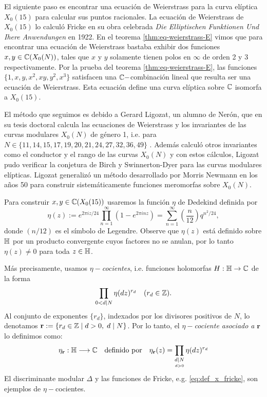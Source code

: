 \documentclass[../../tesis_maestria]{subfiles}
\begin{document}
El siguiente paso es encontrar una ecuación de Weierstrass para la curva elíptica $X_0(15)$ para calcular sus puntos racionales. La ecuación de Weierstrass de $X_0(15)$ lo calculó Fricke en su obra celebrada \emph{Die Elliptischen Funktionen Und Ihere Anwendungen} en 1922. En el teorema \ref{thm:eq-weierstrass-E} vimos que para encontrar una ecuación de Weierstrass bastaba exhibir dos funciones $x,y\in\mathbb{C}(X_0(N))$, tales que $x$ y $y$ solamente tienen polos en $\infty$ de orden 2 y 3 respectivamente. Por la prueba del teorema \ref{thm:eq-weierstrass-E}, las funciones $\{1,x,y,x^2,xy,y^2,x^3\}$ satisfacen una $\mathbb{C}-$combinación lineal que resulta ser una ecuación de Weierstrass. Esta ecuación define una curva elíptica sobre $\mathbb{C}$ isomorfa a $X_0(15)$.

El método que seguimos es debido a Gerard Ligozat, un alumno de Nerón, que en su tesis doctoral calcula las ecuaciones de Weierstrass y los invariantes de las curvas modulares $X_0(N)$ de género 1, i.e. para $N\in\{11,14,15,17,19,20,21,24,27,32,36,49\}$ \cite{LigozatCMDG1}. Además calculó otros invariantes como el conductor y el rango de las curvas $X_0(N)$ y con estos cálculos, Ligozat pudo verificar la conjetura de Birch y Swinnerton-Dyer para las curvas modulares elípticas. Ligozat generalizó un método desarrollado por Morris Newmann en los a\~nos 50 para construir sistemáticamente funciones meromorfas sobre $X_0(N)$.

Para construir $x,y\in \mathbb{C}(X_0(15))$ usaremos la función $\eta$ de Dedekind definida por
\begin{equation}\label{defin:eta}
	\eta(z):=e^{2\pi iz/24}\prod_{n=1}^\infty(1-e^{2\pi inz})=\sum_{n=1}^{\infty} \left(\frac{n}{12}\right)q^{n^2/24},
\end{equation}
donde $(n/12)$ es el símbolo de Legendre. Observe que $\eta(z)$ está definido sobre $\mathbb{H}$ por un producto convergente cuyos factores no se anulan, por lo tanto $\eta(z)\neq0$ para toda $z\in\mathbb{H}$.

Más precisamente, usamos $\eta-$\emph{cocientes}, i.e. funciones holomorfas $H:\mathbb{H}\rightarrow\mathbb{C}$ de la forma
\[
	\prod_{0<d\mid N}\eta(dz)^{r_d} \quad (r_d\in\mathbb{Z}).
\]
Al conjunto de exponentes $\{r_d\}$, indexados por los divisores positivos de $N$, lo denotamos $\mathbf{r}:=\{r_d\in\mathbb{Z}\mid d>0,\; d\mid N\}$. Por lo tanto, el $\eta-$\emph{cociente asociado a} $\mathbf{r}$ lo definimos como:
\[
	\eta_{\mathbf{r}}:\mathbb{H}\longrightarrow\mathbb{C}\quad\text{definido por}\quad
	\eta_{\mathbf{r}}(z)=\prod_{\underset{d>0}{d\mid N}}\eta(dz)^{r_d}
\]
El discriminante modular $\Delta$ y las funciones de Fricke, e.g.  \eqref{eq:def_x_fricke}, son ejemplos de $\eta-$cocientes.
\end{document}
